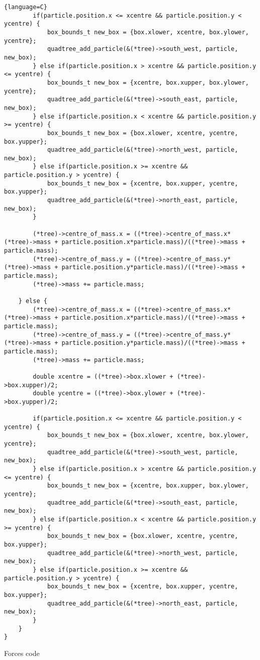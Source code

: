 \begin{lstlisting}{language=C}
        if(particle.position.x <= xcentre && particle.position.y < ycentre) {
            box_bounds_t new_box = {box.xlower, xcentre, box.ylower, ycentre};
            quadtree_add_particle(&(*tree)->south_west, particle, new_box);
        } else if(particle.position.x > xcentre && particle.position.y <= ycentre) {
            box_bounds_t new_box = {xcentre, box.xupper, box.ylower, ycentre};
            quadtree_add_particle(&(*tree)->south_east, particle, new_box);
        } else if(particle.position.x < xcentre && particle.position.y >= ycentre) {
            box_bounds_t new_box = {box.xlower, xcentre, ycentre, box.yupper};
            quadtree_add_particle(&(*tree)->north_west, particle, new_box);
        } else if(particle.position.x >= xcentre && particle.position.y > ycentre) {
            box_bounds_t new_box = {xcentre, box.xupper, ycentre, box.yupper};
            quadtree_add_particle(&(*tree)->north_east, particle, new_box);
        }

        (*tree)->centre_of_mass.x = ((*tree)->centre_of_mass.x*(*tree)->mass + particle.position.x*particle.mass)/((*tree)->mass + particle.mass);
        (*tree)->centre_of_mass.y = ((*tree)->centre_of_mass.y*(*tree)->mass + particle.position.y*particle.mass)/((*tree)->mass + particle.mass);
        (*tree)->mass += particle.mass;

    } else {
        (*tree)->centre_of_mass.x = ((*tree)->centre_of_mass.x*(*tree)->mass + particle.position.x*particle.mass)/((*tree)->mass + particle.mass);
        (*tree)->centre_of_mass.y = ((*tree)->centre_of_mass.y*(*tree)->mass + particle.position.y*particle.mass)/((*tree)->mass + particle.mass);
        (*tree)->mass += particle.mass;

        double xcentre = ((*tree)->box.xlower + (*tree)->box.xupper)/2;
        double ycentre = ((*tree)->box.ylower + (*tree)->box.yupper)/2;

        if(particle.position.x <= xcentre && particle.position.y < ycentre) {
            box_bounds_t new_box = {box.xlower, xcentre, box.ylower, ycentre};
            quadtree_add_particle(&(*tree)->south_west, particle, new_box);
        } else if(particle.position.x > xcentre && particle.position.y <= ycentre) {
            box_bounds_t new_box = {xcentre, box.xupper, box.ylower, ycentre};
            quadtree_add_particle(&(*tree)->south_east, particle, new_box);
        } else if(particle.position.x < xcentre && particle.position.y >= ycentre) {
            box_bounds_t new_box = {box.xlower, xcentre, ycentre, box.yupper};
            quadtree_add_particle(&(*tree)->north_west, particle, new_box);
        } else if(particle.position.x >= xcentre && particle.position.y > ycentre) {
            box_bounds_t new_box = {xcentre, box.xupper, ycentre, box.yupper};
            quadtree_add_particle(&(*tree)->north_east, particle, new_box);
        }
    }
}
\end{lstlisting}
\begin{center}
    Forces code
\end{center}

